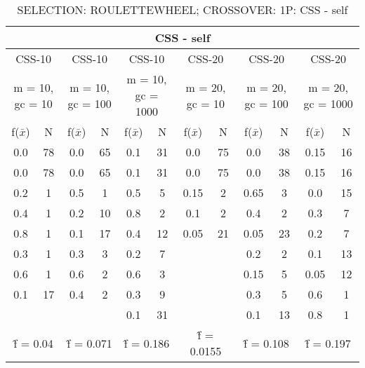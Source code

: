 \begin{table}[H]
	\centering
	\caption{SELECTION: ROULETTEWHEEL; CROSSOVER: 1P: CSS - self}
	\begin{adjustbox}{width=1\textwidth}
		\begin{tabular}{ |c|c||c|c||c|c||c|c||c|c||c|c| }
			\hline
			\multicolumn{12}{|c|}{CSS - self} \\
			\hline
			\multicolumn{2}{|c||}{CSS-10} & \multicolumn{2}{c||}{CSS-10} & \multicolumn{2}{c||}{CSS-10} & \multicolumn{2}{c||}{CSS-20} & \multicolumn{2}{c||}{CSS-20} & \multicolumn{2}{c|}{CSS-20}\\
			\hline
			\multicolumn{2}{|c||}{m = 10, gc = 10} & \multicolumn{2}{c||}{m = 10, gc = 100} & \multicolumn{2}{c||}{m = 10, gc = 1000} & \multicolumn{2}{c||}{m = 20, gc = 10} & \multicolumn{2}{c||}{m = 20, gc = 100} & \multicolumn{2}{c|}{m = 20, gc = 1000}\\
			\hline
			f($\bar{x}$) & N & f($\bar{x}$) & N & f($\bar{x}$) & N & f($\bar{x}$) & N & f($\bar{x}$) & N & f($\bar{x}$) & N\\
			\hline
			\hline
			0.0 & 78 & 0.0 & 65 & 0.1 & 31 & 0.0 & 75 & 0.0 & 38 & 0.15 & 16\\
			\hline
			0.0 & 78 & 0.0 & 65 & 0.1 & 31 & 0.0 & 75 & 0.0 & 38 & 0.15 & 16\\
			0.2 & 1 & 0.5 & 1 & 0.5 & 5 & 0.15 & 2 & 0.65 & 3 & 0.0 & 15\\
			0.4 & 1 & 0.2 & 10 & 0.8 & 2 & 0.1 & 2 & 0.4 & 2 & 0.3 & 7\\
			0.8 & 1 & 0.1 & 17 & 0.4 & 12 & 0.05 & 21 & 0.05 & 23 & 0.2 & 7\\
			0.3 & 1 & 0.3 & 3 & 0.2 & 7 &   &   & 0.2 & 2 & 0.1 & 13\\
			0.6 & 1 & 0.6 & 2 & 0.6 & 3 &   &   & 0.15 & 5 & 0.05 & 12\\
			0.1 & 17 & 0.4 & 2 & 0.3 & 9 &   &   & 0.3 & 5 & 0.6 & 1\\
			&   &   &   & 0.1 & 31 &   &   & 0.1 & 13 & 0.8 & 1\\
			\hline
			\multicolumn{2}{|c||}{\^{f} = 0.04} & \multicolumn{2}{c||}{\^{f} = 0.071} & \multicolumn{2}{c||}{\^{f} = 0.186} & \multicolumn{2}{c||}{\^{f} = 0.0155} & \multicolumn{2}{c||}{\^{f} = 0.108} & \multicolumn{2}{c|}{\^{f} = 0.197}\\
			\hline
		\end{tabular}
	\end{adjustbox}
\end{table}
